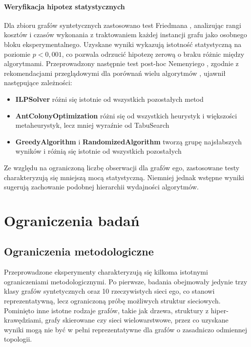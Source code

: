 \paragraph{Weryfikacja hipotez statystycznych}

Dla zbioru grafów syntetycznych zastosowano test Friedmana \cite{friedman1937}, analizując rangi kosztów i czasów wykonania z traktowaniem każdej instancji grafu jako osobnego bloku eksperymentalnego. Uzyskane wyniki wykazują istotność statystyczną na poziomie $p < 0{,}001$, co pozwala odrzucić hipotezę zerową o braku różnic między algorytmami. Przeprowadzony następnie test post-hoc Nemenyiego \cite{nemenyi1963}, zgodnie z rekomendacjami przeglądowymi dla porównań wielu algorytmów \cite{demsar2006}, ujawnił następujące zależności:

\begin{itemize}
\item \textbf{ILPSolver} różni się istotnie od wszystkich pozostałych metod
\item \textbf{AntColonyOptimization} różni się od wszystkich heurystyk i większości metaheurystyk, lecz mniej wyraźnie od TabuSearch
\item \textbf{GreedyAlgorithm} i \textbf{RandomizedAlgorithm} tworzą grupę najsłabszych wyników i różnią się istotnie od wszystkich pozostałych
\end{itemize}

Ze względu na ograniczoną liczbę obserwacji dla grafów ego, zastosowane testy charakteryzują się mniejszą mocą statystyczną. Niemniej jednak wstępne wyniki sugerują zachowanie podobnej hierarchii wydajności algorytmów.

\section{Ograniczenia badań}

\subsection{Ograniczenia metodologiczne}

Przeprowadzone eksperymenty charakteryzują się kilkoma istotnymi ograniczeniami metodologicznymi. Po pierwsze, badania obejmowały jedynie trzy klasy grafów syntetycznych oraz 10 rzeczywistych sieci ego, co stanowi reprezentatywną, lecz ograniczoną próbę możliwych struktur sieciowych. Pominięto inne istotne rodzaje grafów, takie jak drzewa, struktury z hiper-krawędziami, grafy skierowane czy sieci wielowarstwowe, przez co uzyskane wyniki mogą nie być w pełni reprezentatywne dla grafów o zasadniczo odmiennej topologii.

